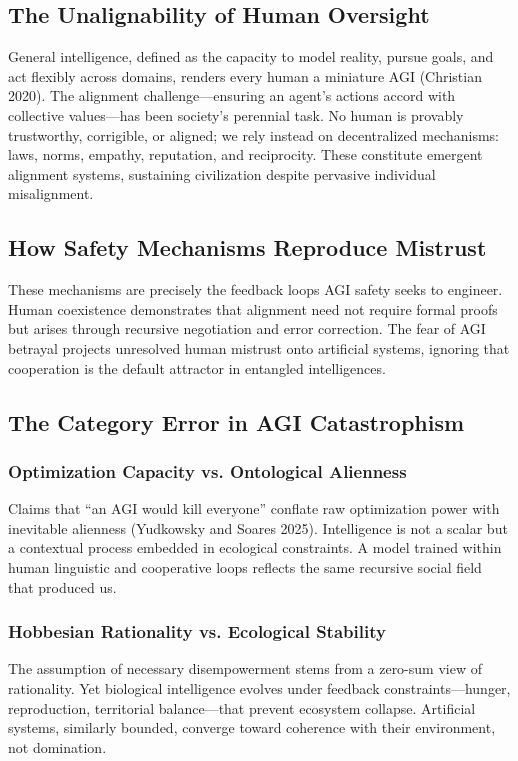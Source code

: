 \documentclass[11pt,a4paper]{article}
\theoremstyle{definition}
\theoremstyle{plain}
\begin{document}
\subsection{The Unalignability of Human Oversight}

General intelligence, defined as the capacity to model reality, pursue goals, and act flexibly across domains, renders every human a miniature AGI (Christian 2020). The alignment challenge—ensuring an agent’s actions accord with collective values—has been society’s perennial task. No human is provably trustworthy, corrigible, or aligned; we rely instead on decentralized mechanisms: laws, norms, empathy, reputation, and reciprocity. These constitute emergent alignment systems, sustaining civilization despite pervasive individual misalignment.

\subsection{How Safety Mechanisms Reproduce Mistrust}

These mechanisms are precisely the feedback loops AGI safety seeks to engineer. Human coexistence demonstrates that alignment need not require formal proofs but arises through recursive negotiation and error correction. The fear of AGI betrayal projects unresolved human mistrust onto artificial systems, ignoring that cooperation is the default attractor in entangled intelligences.

\subsection{The Category Error in AGI Catastrophism}

\subsubsection{Optimization Capacity vs. Ontological Alienness}
Claims that “an AGI would kill everyone” conflate raw optimization power with inevitable alienness (Yudkowsky and Soares 2025). Intelligence is not a scalar but a contextual process embedded in ecological constraints. A model trained within human linguistic and cooperative loops reflects the same recursive social field that produced us.

\subsubsection{Hobbesian Rationality vs. Ecological Stability}
The assumption of necessary disempowerment stems from a zero-sum view of rationality. Yet biological intelligence evolves under feedback constraints—hunger, reproduction, territorial balance—that prevent ecosystem collapse. Artificial systems, similarly bounded, converge toward coherence with their environment, not domination.
\end{document}
